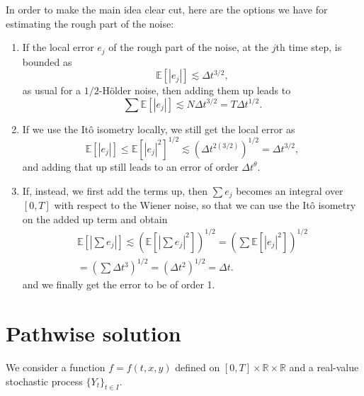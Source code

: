 \documentclass[reqno,12pt]{amsart}
\theoremstyle{plain}%
\theoremstyle{definition}
\begin{document}
In order to make the main idea clear cut, here are the options we have for estimating the rough part of the noise:
\begin{enumerate}
  \item If the local error $e_j$ of the rough part of the noise, at the $j$th time step, is bounded as
    $$
    \mathbb{E}[|e_j|] \lesssim \Delta t^{3/2},
    $$
    as usual for a $1/2$-H\"older noise, then adding them up leads to 
    $$
      \sum \mathbb{E}[|e_j|] \lesssim N\Delta t^{3/2} = T\Delta t^{1/2}.
    $$
    \item If we use the It\^o isometry locally, we still get the local error as
    $$
      \mathbb{E}[|e_j|] \leq \mathbb{E}[|e_j|^2]^{1/2} \lesssim \left(\Delta t^{2(3/2)} \right)^{1/2} = \Delta t^{3/2},
    $$
    and adding that up still leads to an error of order $\Delta t^{\theta}$.
    \item If, instead, we first add the terms up, then $\sum e_j$ becomes an integral over $[0, T]$ with respect to the Wiener noise, so that we can use the It\^o isometry on the added up term and obtain
    \begin{multline*}
      \mathbb{E}\left[ \left| \sum e_j \right| \right] \lesssim \left(\mathbb{E}\left[ \left| \sum e_j \right|^2 \right]\right)^{1/2} = \left( \sum \mathbb{E}[|e_j|^2] \right)^{1/2} \\
      = \left( \sum \Delta t^3 \right)^{1/2} = \left( \Delta t^2 \right)^{1/2} = \Delta t.
    \end{multline*}
    and we finally get the error to be of order 1.
\end{enumerate}

\section{Pathwise solution}

We consider a function $f=f(t, x, y)$ defined on $[0, T]\times \mathbb{R}\times\mathbb{R}$ and a real-value stochastic process $\{Y_t\}_{t\in I}$.
\end{document}
